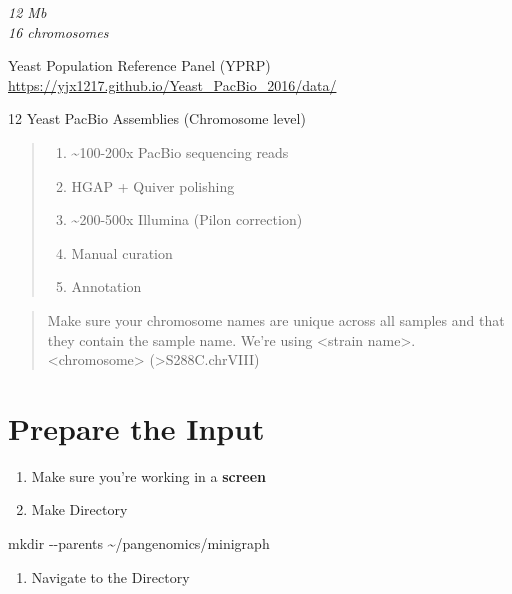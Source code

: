 \documentclass[
]{book}
\newenvironment{Shaded}{\begin{snugshade}}{\end{snugshade}}
\newcommand{\AttributeTok}[1]{\textcolor[rgb]{0.77,0.63,0.00}{#1}}
\newcommand{\FunctionTok}[1]{\textcolor[rgb]{0.00,0.00,0.00}{#1}}
\newcommand{\NormalTok}[1]{#1}
\providecommand{\tightlist}{%
  \setlength{\itemsep}{0pt}\setlength{\parskip}{0pt}}
\begin{document}
\emph{12 Mb}\\
\emph{16 chromosomes}

Yeast Population Reference Panel (YPRP) \url{https://yjx1217.github.io/Yeast_PacBio_2016/data/}

12 Yeast PacBio Assemblies (Chromosome level)

\begin{quote}
\begin{enumerate}
\def\labelenumi{\arabic{enumi}.}
\tightlist
\item
  \textasciitilde100-200x PacBio sequencing reads
\item
  HGAP + Quiver polishing\\
\item
  \textasciitilde200-500x Illumina (Pilon correction)\\
\item
  Manual curation\\
\item
  Annotation
\end{enumerate}
\end{quote}

\begin{quote}
Make sure your chromosome names are unique across all samples and that they contain the sample name. We're using \textless strain name\textgreater.\textless chromosome\textgreater{} (\textgreater S288C.chrVIII)
\end{quote}

\hypertarget{prepare-the-input}{%
\section{Prepare the Input}\label{prepare-the-input}}

\begin{enumerate}
\def\labelenumi{\arabic{enumi}.}
\item
  Make sure you're working in a \textbf{screen}
\item
  Make Directory
\end{enumerate}

\begin{Shaded}
\begin{Highlighting}[]
\FunctionTok{mkdir} \AttributeTok{{-}{-}parents}\NormalTok{ \textasciitilde{}/pangenomics/minigraph}
\end{Highlighting}
\end{Shaded}

\begin{enumerate}
\def\labelenumi{\arabic{enumi}.}
\setcounter{enumi}{2}
\tightlist
\item
  Navigate to the Directory
\end{enumerate}
\end{document}
